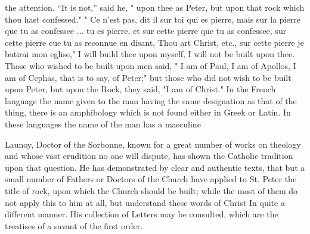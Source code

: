 the attention. “It is not,” said he, " upon thee as Peter, but upon that rock which thou hast confessed." " Ce n'est pas, dit il sur toi qui es pierre, mais sur la pierre que tu as confessee ... tu es pierre, et sur cette pierre que tu as confessee, sur cette pierre cue tu as reconnue en disant, Thou art Christ, etc., sur cette pierre je batirai mon eglise," I will build thee upon myself, I will not be built upon thee. Those who wished to be built upon men said, " I am of Paul, I am of Apollos, I am of Cephas, that is to say, of Peter;" but those who did not wish to be built upon Peter, but upon the Rock, they said, "I am of Christ." In the French language the name given to the man having the same designation as that of the thing, there is an amphibology which is not found either in Greek or Latin. In these languages the name of the man has a masculine

Launoy, Doctor of the Sorbonne, known for a great number of works on theology and whose vast erudition no one will dispute, has shown the Catholic tradition upon that question. He has demonstrated by clear and authentic texts, that but a small number of Fathers or Doctors of the Church have applied to St. Peter the title of rock, upon which the Church should be built; while the most of them do not apply this to him at all, but understand these words of Christ In quite a different manner. His collection of Letters may be consulted, which are the treatises of a savant of the first order.

